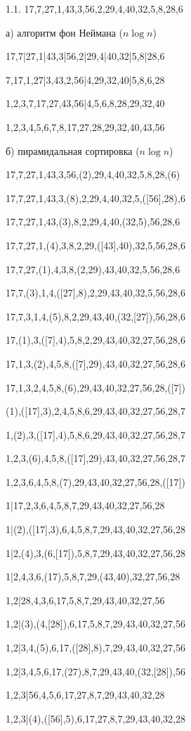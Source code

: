 \documentclass[russian]{article}
\begin{document}
1.1. 17,7,27,1,43,3,56,2,29,4,40,32,5,8,28,6

а) алгоритм фон Неймана ($n\log{n}$)

17,7|27,1|43,3|56,2|29,4|40,32|5,8|28,6

7,17,1,27|3,43,2,56|4,29,32,40|5,8,6,28

1,2,3,7,17,27,43,56|4,5,6,8,28,29,32,40

1,2,3,4,5,6,7,8,17,27,28,29,32,40,43,56

б) пирамидальная сортировка ($n\log{n}$)

17,7,27,1,43,3,56,(2),29,4,40,32,5,8,28,(6)

17,7,27,1,43,3,(8),2,29,4,40,32,5,([56],28),6

17,7,27,1,43,(3),8,2,29,4,40,(32,5),56,28,6

17,7,27,1,(4),3,8,2,29,([43],40),32,5,56,28,6

17,7,27,(1),4,3,8,(2,29),43,40,32,5,56,28,6

17,7,(3),1,4,([27],8),2,29,43,40,32,5,56,28,6

17,7,3,1,4,(5),8,2,29,43,40,(32,[27]),56,28,6

17,(1),3,([7],4),5,8,2,29,43,40,32,27,56,28,6

17,1,3,(2),4,5,8,([7],29),43,40,32,27,56,28,6

17,1,3,2,4,5,8,(6),29,43,40,32,27,56,28,([7])

(1),([17],3),2,4,5,8,6,29,43,40,32,27,56,28,7

1,(2),3,([17],4),5,8,6,29,43,40,32,27,56,28,7

1,2,3,(6),4,5,8,([17],29),43,40,32,27,56,28,7

1,2,3,6,4,5,8,(7),29,43,40,32,27,56,28,([17])

1|17,2,3,6,4,5,8,7,29,43,40,32,27,56,28

1|(2),([17],3),6,4,5,8,7,29,43,40,32,27,56,28

1|2,(4),3,(6,[17]),5,8,7,29,43,40,32,27,56,28

1|2,4,3,6,(17),5,8,7,29,(43,40),32,27,56,28

1,2|28,4,3,6,17,5,8,7,29,43,40,32,27,56

1,2|(3),(4,[28]),6,17,5,8,7,29,43,40,32,27,56

1,2|3,4,(5),6,17,([28],8),7,29,43,40,32,27,56

1,2|3,4,5,6,17,(27),8,7,29,43,40,(32,[28]),56

1,2,3|56,4,5,6,17,27,8,7,29,43,40,32,28

1,2,3|(4),([56],5),6,17,27,8,7,29,43,40,32,28
\end{document}
